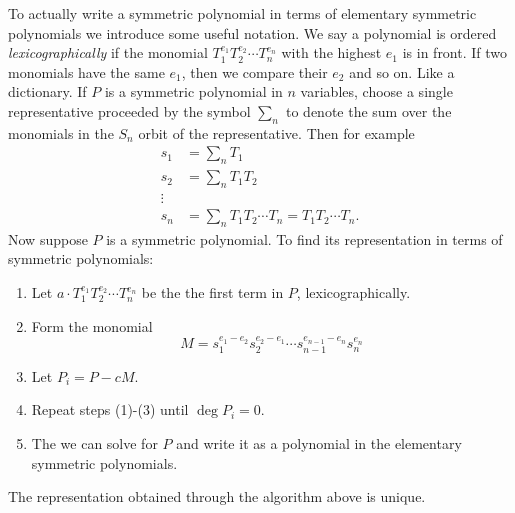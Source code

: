 \documentclass{article}
\theoremstyle{plain}
\theoremstyle{remark}
\begin{document}
    To actually write a symmetric polynomial in terms of elementary symmetric polynomials we introduce some useful notation.
    We say a polynomial is ordered \textit{lexicographically} if the monomial $T_1^{e_1}T_2^{e_2}\cdots T_n^{e_n}$ with the highest $e_1$ is in front.
    If two monomials have the same $e_1$, then we compare their $e_2$ and so on. Like a dictionary.
    If $P$ is a symmetric polynomial in $n$ variables, choose a single representative proceeded by the symbol $\sum_n$ to denote the sum over the monomials in the $S_n$ orbit of the representative.
    Then for example
    \begin{align*}
        s_1&=\sum_n T_1\\
        s_2&=\sum_n T_1T_2\\
        \vdots&\\
        s_n&=\sum_n T_1T_2\cdots T_n=T_1T_2\cdots T_n.
    \end{align*}
    Now suppose $P$ is a symmetric polynomial. To find its representation in terms of symmetric polynomials:
    \begin{enumerate}
        \item Let $a\cdot T_1^{e_1}T_2^{e_2}\cdots T_n^{e_n}$ be the the first term in $P$, lexicographically.
        \item Form the monomial $$M = s_1^{e_1-e_2}s_2^{e_2-e_1}\cdots s_{n-1}^{e_{n-1}-e_n}s_n^{e_n}$$
        \item Let $P_i = P -cM$.
        \item Repeat steps (1)-(3) until $\deg P_i = 0$.
        \item The we can solve for $P$ and write it as a polynomial in the elementary symmetric polynomials.
    \end{enumerate}
    The representation obtained through the algorithm above is unique.
\end{document}
